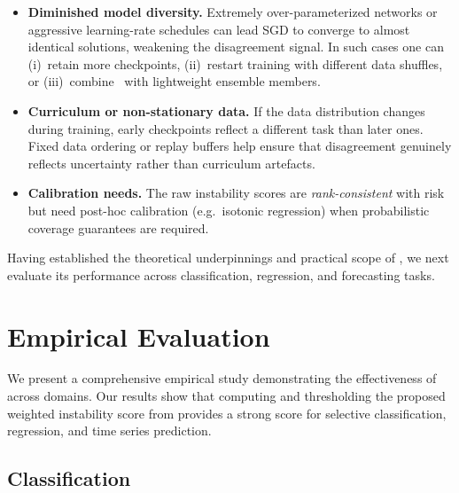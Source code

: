 \begin{itemize}
  \item \textbf{Diminished model diversity.}  Extremely over-parameterized networks or aggressive learning-rate schedules can lead SGD to converge to almost identical solutions, weakening the disagreement signal.  In such cases one can (i)~retain more checkpoints, (ii)~restart training with different data shuffles, or (iii)~combine \sptd\ with lightweight ensemble members.
  \item \textbf{Curriculum or non-stationary data.}  If the data distribution changes during training, early checkpoints reflect a different task than later ones.  Fixed data ordering or replay buffers help ensure that disagreement genuinely reflects uncertainty rather than curriculum artefacts.
  \item \textbf{Calibration needs.}  The raw instability scores are \emph{rank-consistent} with risk but need post-hoc calibration (e.g.\ isotonic regression) when probabilistic coverage guarantees are required.
\end{itemize}

Having established the theoretical underpinnings and practical scope of \sptd, we next evaluate its performance across classification, regression, and forecasting tasks.


\section{Empirical Evaluation}
\label{sec:emp_eval}

We present a comprehensive empirical study demonstrating the effectiveness of \sptd across domains. Our results show that computing and thresholding the proposed weighted instability score from \sptd provides a strong score for selective classification, regression, and time series prediction.

\subsection{Classification}

